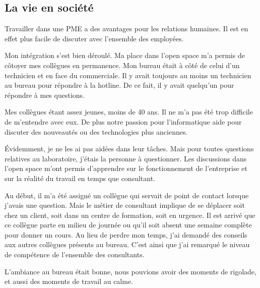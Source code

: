 \subsection{La vie en société}
Travailler dans une PME a des avantages pour les relations humaines.
Il est en effet plus facile de discuter avec l'ensemble des employées.

Mon intégration s'est bien déroulé. 
Ma place dans l'open space m'a permis de côtoyer mes collègues en permanence.
Mon bureau était à côté de celui d'un technicien et en face du commerciale.
Il y avait toujours au moins un technicien au bureau pour répondre à la hotline.
De ce fait, il y avait quelqu'un pour répondre à mes questions. 

Mes collègues étant assez jeunes, moins de 40 ans.
Il ne m'a pas été trop difficile de m'entendre avec eux.
De plus notre passion pour l'informatique aide pour discuter des nouveautés ou des technologies plus anciennes.

\'Evidemment, je ne les ai pas aidées dans leur tâches.
Mais pour toutes questions relatives au laboratoire, j'étais la personne à questionner. 
Les discussions dans l'open space m'ont permis d'apprendre sur le fonctionnement de l'entreprise et sur la réalité du travail en temps que consultant.

Au début, il m'a été assigné un collègue qui servait de point de contact lorsque j'avais une question.
Mais le métier de consultant implique de se déplacer soit chez un client, soit dans un centre de formation, soit en urgence.
Il est arrivé que ce collègue parte en milieu de journée ou qu'il soit absent une semaine complète pour donner un cours.
Au lieu de perdre mon temps, j'ai demandé des conseils aux autres collègues présents au bureau.
C'est ainsi que j'ai remarqué le niveau de compétence de l'ensemble des consultants.

L'ambiance au bureau était bonne, nous pouvions avoir des moments de rigolade, et aussi des moments de travail au calme.

